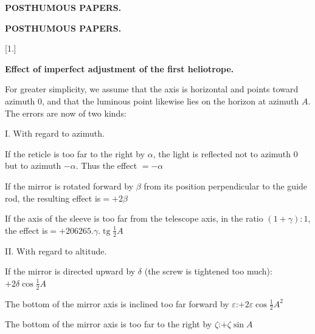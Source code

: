 \clearpage
\noindent{}\hfill{\small\textbf{POSTHUMOUS PAPERS.}}\hfill\null\par
\vspace*{32mm}
\begin{center}
{\Large\bfseries POSTHUMOUS PAPERS.}\par\vspace{15mm}
[1.]\par\medskip
\textbf{Effect of imperfect adjustment of the first heliotrope.}
\end{center}
For greater simplicity, we assume that the axis is horizontal and points
toward azimuth 0, and that the luminous point likewise lies on the horizon at
azimuth $A$. The errors are now of two kinds:

\noindent I. With regard to azimuth.
\begin{list}{}{\setlength{\leftmargin}{9mm}\setlength{\labelwidth}{6mm}\setlength{\itemsep}{2pt}\setlength{\parsep}{0pt}\setlength{\topsep}{3pt}}
\item[1.] If the reticle is too far to the right by $\alpha$,
the light is reflected not to azimuth 0 but to azimuth
$-\alpha$. Thus the effect $=-\alpha$
\item[2.] If the mirror is rotated forward by $\beta$ from its
position perpendicular to the guide rod, the resulting
effect is\hfill $=+2\beta$
\item[3.] If the axis of the sleeve is too far from the telescope
axis, in the ratio $(1+\gamma):1$, the effect is\hfill $=+206265.\gamma.\operatorname{tg}\frac12 A$
\end{list}
\noindent II. With regard to altitude.
\begin{list}{}{\setlength{\leftmargin}{9mm}\setlength{\labelwidth}{6mm}\setlength{\itemsep}{2pt}\setlength{\parsep}{0pt}\setlength{\topsep}{3pt}}
\item[4.] If the mirror is directed upward by $\delta$
(the screw is tightened too much):\hfill $+2\delta\cos\frac12 A$
\item[5.] The bottom of the mirror axis is inclined too far
forward by $\varepsilon$:\hfill $+2\varepsilon\cos\frac12 A^2$
\item[6.] The bottom of the mirror axis is too far to the right by $\zeta$:\hfill $+\zeta\sin A$
\end{list}

